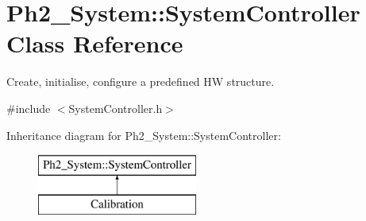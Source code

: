\hypertarget{class_ph2___system_1_1_system_controller}{\section{Ph2\-\_\-\-System\-:\-:System\-Controller Class Reference}
\label{class_ph2___system_1_1_system_controller}
}


Create, initialise, configure a predefined H\-W structure.  




{\ttfamily \#include $<$System\-Controller.\-h$>$}

Inheritance diagram for Ph2\-\_\-\-System\-:\-:System\-Controller\-:\begin{figure}[H]
\begin{center}
\leavevmode
\includegraphics[height=2.000000cm]{class_ph2___system_1_1_system_controller}
\end{center}
\end{figure}

